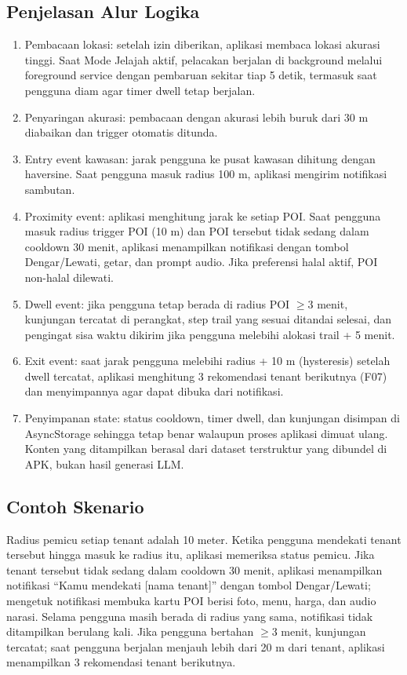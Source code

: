 \subsection{Penjelasan Alur Logika}
\begin{enumerate}
  \item Pembacaan lokasi: setelah izin diberikan, aplikasi membaca lokasi akurasi tinggi. Saat Mode Jelajah aktif, pelacakan berjalan di background melalui foreground service dengan pembaruan sekitar tiap 5 detik, termasuk saat pengguna diam agar timer dwell tetap berjalan.
  \item Penyaringan akurasi: pembacaan dengan akurasi lebih buruk dari 30 m diabaikan dan trigger otomatis ditunda.
  \item Entry event kawasan: jarak pengguna ke pusat kawasan dihitung dengan haversine. Saat pengguna masuk radius 100 m, aplikasi mengirim notifikasi sambutan.
  \item Proximity event: aplikasi menghitung jarak ke setiap POI. Saat pengguna masuk radius trigger POI (10 m) dan POI tersebut tidak sedang dalam cooldown 30 menit, aplikasi menampilkan notifikasi dengan tombol Dengar/Lewati, getar, dan prompt audio. Jika preferensi halal aktif, POI non-halal dilewati.
  \item Dwell event: jika pengguna tetap berada di radius POI \(\ge\)3 menit, kunjungan tercatat di perangkat, step trail yang sesuai ditandai selesai, dan pengingat sisa waktu dikirim jika pengguna melebihi alokasi trail + 5 menit.
  \item Exit event: saat jarak pengguna melebihi radius + 10 m (hysteresis) setelah dwell tercatat, aplikasi menghitung 3 rekomendasi tenant berikutnya (F07) dan menyimpannya agar dapat dibuka dari notifikasi.
  \item Penyimpanan state: status cooldown, timer dwell, dan kunjungan disimpan di AsyncStorage sehingga tetap benar walaupun proses aplikasi dimuat ulang. Konten yang ditampilkan berasal dari dataset terstruktur yang dibundel di APK, bukan hasil generasi LLM.
\end{enumerate}

\subsection{Contoh Skenario}

Radius pemicu setiap tenant adalah 10 meter. Ketika pengguna mendekati tenant tersebut hingga masuk ke radius itu, aplikasi memeriksa status pemicu. Jika tenant tersebut tidak sedang dalam cooldown 30 menit, aplikasi menampilkan notifikasi ``Kamu mendekati [nama tenant]'' dengan tombol Dengar/Lewati; mengetuk notifikasi membuka kartu POI berisi foto, menu, harga, dan audio narasi. Selama pengguna masih berada di radius yang sama, notifikasi tidak ditampilkan berulang kali. Jika pengguna bertahan \(\ge\)3 menit, kunjungan tercatat; saat pengguna berjalan menjauh lebih dari 20 m dari tenant, aplikasi menampilkan 3 rekomendasi tenant berikutnya.

